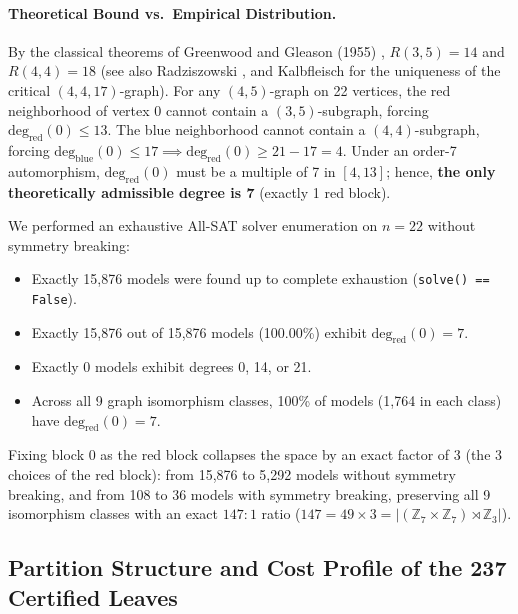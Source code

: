 \documentclass[11pt,a4paper]{article}
\theoremstyle{definition}
\begin{document}
\paragraph{Theoretical Bound vs.\ Empirical Distribution.} By the classical theorems of Greenwood and Gleason (1955) \cite{greenwood1955}, $R(3,5) = 14$ and $R(4,4) = 18$ (see also Radziszowski \cite{radziszowski2021}, and Kalbfleisch \cite{kalbfleisch1966} for the uniqueness of the critical $(4,4,17)$-graph). For any $(4,5)$-graph on 22 vertices, the red neighborhood of vertex 0 cannot contain a $(3,5)$-subgraph, forcing $\text{deg}_{\text{red}}(0) \le 13$. The blue neighborhood cannot contain a $(4,4)$-subgraph, forcing $\text{deg}_{\text{blue}}(0) \le 17 \implies \text{deg}_{\text{red}}(0) \ge 21 - 17 = 4$. Under an order-7 automorphism, $\text{deg}_{\text{red}}(0)$ must be a multiple of 7 in $[4, 13]$; hence, \textbf{the only theoretically admissible degree is 7} (exactly 1 red block).

We performed an exhaustive All-SAT solver enumeration on $n=22$ without symmetry breaking:
\begin{itemize}
    \item Exactly 15,876 models were found up to complete exhaustion (\texttt{solve() == False}).
    \item Exactly 15,876 out of 15,876 models (100.00\%) exhibit $\text{deg}_{\text{red}}(0) = 7$.
    \item Exactly 0 models exhibit degrees 0, 14, or 21.
    \item Across all 9 graph isomorphism classes, 100\% of models (1,764 in each class) have $\text{deg}_{\text{red}}(0) = 7$.
\end{itemize}
Fixing block 0 as the red block collapses the space by an exact factor of 3 (the 3 choices of the red block): from 15,876 to 5,292 models without symmetry breaking, and from 108 to 36 models with symmetry breaking, preserving all 9 isomorphism classes with an exact $147:1$ ratio ($147 = 49 \times 3 = |(\mathbb{Z}_7 \times \mathbb{Z}_7) \rtimes \mathbb{Z}_3|$).

\clearpage
\subsection{Partition Structure and Cost Profile of the 237 Certified Leaves}
\end{document}
